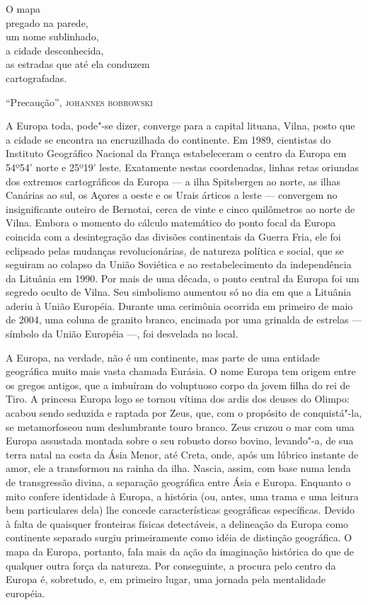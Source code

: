 \epigraph{O mapa\\
pregado na parede,\\
um nome sublinhado,\\
a cidade desconhecida,\\
as estradas que até ela conduzem\\
cartografadas.}{``Precaução'', \textsc{johannes bobrowski}}

A Europa toda, pode"-se dizer, converge para a capital lituana, Vilna,
posto que a cidade se encontra na encruzilhada do continente. Em 1989,
cientistas do Instituto Geográfico Nacional da França estabeleceram o
centro da Europa em 54º54' norte e 25º19' leste. Exatamente nestas
coordenadas, linhas retas oriundas dos extremos cartográficos da Europa
--- a ilha Spitsbergen ao norte, as ilhas Canárias ao sul, os Açores a
oeste e os Urais árticos a leste --- convergem no insignificante outeiro
de Bernotai, cerca de vinte e cinco quilômetros ao norte de Vilna.
Embora o momento do cálculo matemático do ponto focal da Europa coincida
com a desintegração das divisões continentais da Guerra Fria, ele foi
eclipsado pelas mudanças revolucionárias, de natureza política e social,
que se seguiram ao colapso da União Soviética e ao restabelecimento da
independência da Lituânia em 1990. Por mais de uma década, o ponto
central da Europa foi um segredo oculto de Vilna. Seu simbolismo
aumentou só no dia em que a Lituânia aderiu à União Européia. Durante
uma cerimônia ocorrida em primeiro de maio de 2004, uma coluna de
granito branco, encimada por uma grinalda de estrelas --- símbolo da União
Européia ---, foi desvelada no local.

A Europa, na verdade, não é um continente, mas parte de uma entidade
geográfica muito mais vasta chamada Eurásia. O nome Europa tem origem
entre os gregos antigos, que a imbuíram do voluptuoso corpo da jovem
filha do rei de Tiro. A princesa Europa logo se tornou vítima dos ardis
dos deuses do Olimpo: acabou sendo seduzida e raptada por Zeus, que, com
o propósito de conquistá"-la, se metamorfoseou num deslumbrante touro
branco. Zeus cruzou o mar com uma Europa assustada montada sobre o seu
robusto dorso bovino, levando"-a, de sua terra natal na costa da Ásia
Menor, até Creta, onde, após um lúbrico instante de amor, ele a
transformou na rainha da ilha. Nascia, assim, com base numa lenda de
transgressão divina, a separação geográfica entre Ásia e Europa.
Enquanto o mito confere identidade à Europa, a história (ou, antes, uma
trama e uma leitura bem particulares dela) lhe concede características
geográficas específicas. Devido à falta de quaisquer fronteiras físicas
detectáveis, a delineação da Europa como continente separado surgiu
primeiramente como idéia de distinção geográfica. O mapa da Europa,
portanto, fala mais da ação da imaginação histórica do que de qualquer
outra força da natureza. Por conseguinte, a procura pelo centro da
Europa é, sobretudo, e, em primeiro lugar, uma jornada pela mentalidade
européia.

